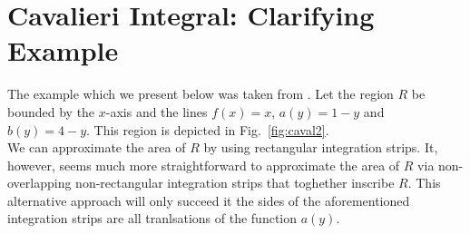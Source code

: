 \documentclass[twoside,reqno,11pt]{fcaa-var} %
\begin{document}
\section{Cavalieri Integral: Clarifying Example}
\label{sec:cav_integral_example}
The example which we present below was taken from \cite{?}. Let the region $R$ be bounded by the $x$-axis and the lines $f(x)=x$, $a(y)=1-y$ and $b(y)=4-y$. This region is depicted in Fig.~\ref{fig:caval2}.\\


We can approximate the area of $R$ by using rectangular integration strips. It, however, seems much more straightforward to approximate the area of $R$ via non-overlapping non-rectangular integration strips that toghether inscribe $R$. This alternative approach 
will only succeed it the sides of the aforementioned integration strips are all tranlsations of the function $a(y)$. 
\end{document}
